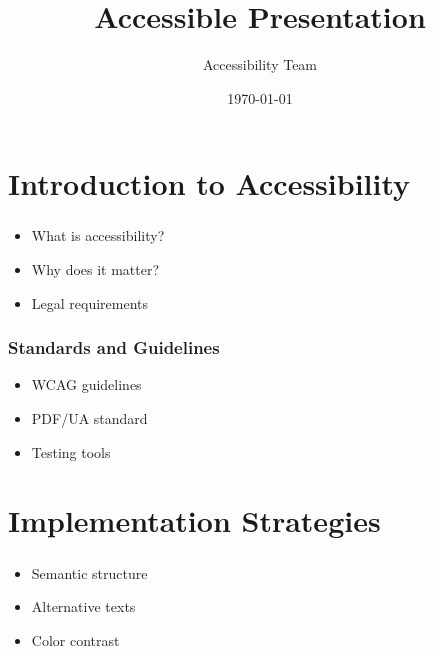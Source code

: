 \documentclass{ltx-talk}
\title{Accessible Presentation}
\author{Accessibility Team}
\institute{University of Inclusive Design}
\date{\today}
\begin{document}

\section{Introduction to Accessibility}

\begin{frame}
  \frametitle{}
  \begin{itemize}
    \item What is accessibility?
    \item Why does it matter?
    \item Legal requirements
  \end{itemize}
\end{frame}

\begin{frame}
  \frametitle{Standards and Guidelines}
  \begin{itemize}
    \item WCAG guidelines
    \item PDF/UA standard
    \item Testing tools
  \end{itemize}
\end{frame}

\section{Implementation Strategies}

\begin{frame}
  \frametitle{}
  \begin{itemize}
    \item Semantic structure
    \item Alternative texts
    \item Color contrast
  \end{itemize}
\end{frame}
\end{document}
